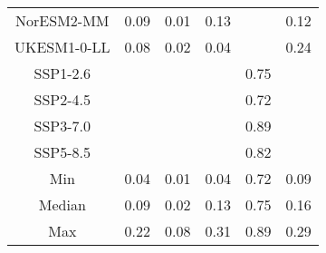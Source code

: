\begin{table*}[t]
\begin{tabular}{c|rrr|rr}
NorESM2-MM & 0.09 & 0.01 & 0.13 &  & 0.12 \\
UKESM1-0-LL & 0.08 & 0.02 & 0.04 &  & 0.24 \\
SSP1-2.6 &  &  &  & 0.75 &  \\
SSP2-4.5 &  &  &  & 0.72 &  \\
SSP3-7.0 &  &  &  & 0.89 &  \\
SSP5-8.5 &  &  &  & 0.82 &  \\
\midrule
Min & 0.04 & 0.01 & 0.04 & 0.72 & 0.09 \\
Median & 0.09 & 0.02 & 0.13 & 0.75 & 0.16 \\
Max & 0.22 & 0.08 & 0.31 & 0.89 & 0.29 \\
\bottomrule
\end{tabular}
\end{table*}

